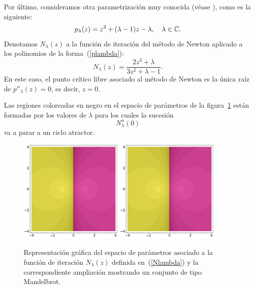 Por último, consideramos  otra parametrización muy conocida (véase \cite{PlazaRomero}), como es la siguiente:
\begin{equation}\label{plambda}
p_{\lambda}(z)=z^3+(\lambda-1)z-\lambda, \quad \lambda\in\mathbb{C}.
\end{equation}
Denotamos $N_{\lambda}(z)$ a la función de iteración del método de Newton aplicado a los polinomios de la forma~(\ref{plambda}):
\begin{equation}\label{Nlambda}
N_{\lambda}(z)=\frac{2z^3+\lambda}{3z^2+\lambda-1}.
\end{equation}
%
En este caso, el punto crítico libre asociado al método de Newton es la única raíz de $p''_{\lambda}(z)=0$, es decir, $z=0$. 

Las regiones coloreadas en negro en el espacio de parámetros de la  figura~\ref{esparam_fig2} están formadas por los valores de $\lambda$ para los cuales la sucesión
$$
N_{\lambda}^{n}(0)
$$ 
va a parar a  un ciclo atractor.

\begin{figure}[htb]
\centering
\includegraphics[width=0.45\textwidth]{NDfigura0.pdf}
\qquad
 \includegraphics[width=0.45\textwidth]{NDfigura0.pdf}
\caption{Representación gráfica del espacio de parámetros asociado a la función de iteración $N_{\lambda}(z)$ definida en~(\ref{Nlambda}) y la correspondiente ampliación mostrando un conjunto de tipo Mandelbrot.}
 \label{esparam_fig2}
\end{figure}


